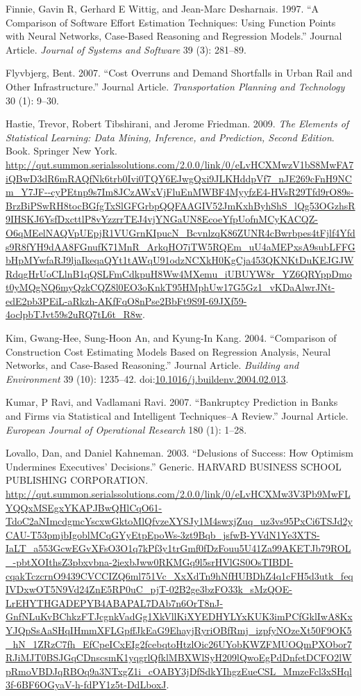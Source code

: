 \documentclass[]{elsarticle} %
\begin{document}
\hypertarget{ref-Finnie1997}{}
Finnie, Gavin R, Gerhard E Wittig, and Jean-Marc Desharnais. 1997. ``A
Comparison of Software Effort Estimation Techniques: Using Function
Points with Neural Networks, Case-Based Reasoning and Regression
Models.'' Journal Article. \emph{Journal of Systems and Software} 39
(3): 281--89.

\hypertarget{ref-Flyvbjerg2007}{}
Flyvbjerg, Bent. 2007. ``Cost Overruns and Demand Shortfalls in Urban
Rail and Other Infrastructure.'' Journal Article. \emph{Transportation
Planning and Technology} 30 (1): 9--30.

\hypertarget{ref-Hastie2009}{}
Hastie, Trevor, Robert Tibshirani, and Jerome Friedman. 2009. \emph{The
Elements of Statistical Learning: Data Mining, Inference, and
Prediction, Second Edition}. Book. Springer New York.
\url{http://qut.summon.serialssolutions.com/2.0.0/link/0/eLvHCXMwzV1bS8MwFA7iQBwD3dR6mRAQfNk6trb0Ivi0TQY6EJwgQxi9JLKHddpVf7_nJE269cFnH9NCm_Y7JF--cyPEtnp9s7Im8JCzAWxVjFluEnMWBF4MyyfzE4-HVsR29Tfd9rO89s-BrzBiPSwRH8tocBGfgTxSlGFGrbpQQFAAGIV52JmKxhByhShS_lQg53OGzhsR9IHSKJ6YsfDxcttlP8vYzzrrTEJ4vjYNGaUN8EcoeYfpUofnMCyKACQZ-O6qMEelNAQVpUEpjR1VUGrnKIpucN_BcvnlzqK86ZUNR4cBwrbpes4tFjlf4Yfds9R8fYH9dAA8FGnufK71MnR_ArkqHO7iTW5RQEm_uU4aMEPxsA9subLFFGbHpMYwfaRJ9ljaIkeqaQYt1tAWqU91odzNCXkH0KgCja453QKNKtDuKEJGJWRdqgHrUoCLlnB1qQSLFmCdkpuH8Ww4MXemu_iUBUYW8r_YZ6QRYppDmot0yMQgNQ6myQzkCQZ8l0EO3oKnkT95HMphUw17G5Gz1_vKDaAlwrJNt-edE2pb3PEiL-aRkzh-AKfFqO8nPse2BbFt9S9I-69JXf59-4oclpbTJvt59s2uRQ7tL6t_R8w}.

\hypertarget{ref-Kim2004}{}
Kim, Gwang-Hee, Sung-Hoon An, and Kyung-In Kang. 2004. ``Comparison of
Construction Cost Estimating Models Based on Regression Analysis, Neural
Networks, and Case-Based Reasoning.'' Journal Article. \emph{Building
and Environment} 39 (10): 1235--42.
doi:\href{https://doi.org/10.1016/j.buildenv.2004.02.013}{10.1016/j.buildenv.2004.02.013}.

\hypertarget{ref-Kumar2007}{}
Kumar, P Ravi, and Vadlamani Ravi. 2007. ``Bankruptcy Prediction in
Banks and Firms via Statistical and Intelligent Techniques--A Review.''
Journal Article. \emph{European Journal of Operational Research} 180
(1): 1--28.

\hypertarget{ref-Lovallo2003}{}
Lovallo, Dan, and Daniel Kahneman. 2003. ``Delusions of Success: How
Optimism Undermines Executives' Decisions.'' Generic. HARVARD BUSINESS
SCHOOL PUBLISHING CORPORATION.
\url{http://qut.summon.serialssolutions.com/2.0.0/link/0/eLvHCXMw3V3Pb9MwFLYQQxMSEgxYKAPJBwQHlCqO61-TdoC2aNImcdgmcYscxwGktoMlQfvzeXYSJy1M4swxjZuq_uz3vs95PxCi6TSJd2yCAU-T53pmjbIgoblMCqGYyEtpEpoWs-3zt9Bqb_jsfwB-YVdN1Ye3XTS-IaLT_a553GcwEGvXFsO3O1q7kPf3y1trGmf0fDzFouu5U41Za99AKETJb79ROL_-pbtXOIthsZ3pbxvbna-2iexbJww0RKMGq9l5srHVlGS0OsTIBDI-cqakTczcrnO9439CVCCIZQ6ml751Vc_XxXdTn9hNfHUBDhZ4q1cFH5d3utk_feqIVDxwOT5N9Vd24ZnE5RP0uC_pjT-02B2ge3bzFO33k_sMzQOE-LrEHYTHGADEPYB4ABAPAL7DAb7n6OrT8nJ-GnfNLuKvBChkzFTJcgnkVadGg1XkVllKiXYEDHYLYxKUK3imPCfGklIwA8KxYJQpSsAaSHqIHmmXFLGpffJkEaG9EhayjRyriOBfRmj_izpfyNOzeXt50F9OK5_hN_1ZRzC7fh_EfCpeICxEIg2fcebqtoHtzlOic26UYobKWZFMUOQmPXObor7RJiMJT0BSJGqCDnscsmK1yqgrlQfklMBXWlSyH209lQwoEgPdDnfetDCFO2lWpRmoVBDJqRBOq9a3NTxgZ1i_cOABY3jDfSdkYIhgzEueCSL_MmzeFcl3xSHql3f-6BF6OGyaV-h-fdPY1z5t-DdLboxJ}.
\end{document}

